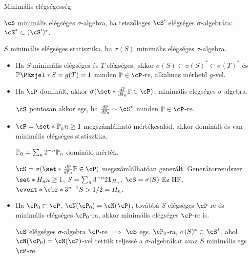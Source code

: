 \documentclass[aspectratio=169,notheorems,9pt,\option]{beamer}
\begin{document}
\begin{frame}{Minimális elégségesség}
  \begin{df}
    $\cS$ minimális elégséges $\sigma$-algebra, ha tetszőleges  
    $\cS'$ elégséges $\sigma$-algebrára: $\cS^*\subset (\cS')^*$.

    $S$ minimális elégséges statisztika, ha $\sigma(S)$ minimális elégséges $\sigma$-algebra.
  \end{df}
  \continue
  \begin{itemize}
    \item Ha $S$ minimális elégséges és $T$ elégséges, akkor $\sigma(S)\subset\sigma(S)^*\subset \sigma(T)^*$ 
    és $\P{S=g(T)}=1$ minden $\P\in\cP$-re, alkalmas mérhető $g$-vel.
    \item Ha $\cP$ dominált, akkor $\sigma(\set*{\frac{d\P}{d\P[0]}}{\P\in\cP})$,
    minimális elégséges $\sigma$-algebra.
    \pause

    $\cS$ pontosan akkor egs, ha $\frac{d\P}{d\P[0]}\sim\cS^*$ minden $\P\in\cP$-re. 

    \item $\cP=\set*{\P[n]}{n\geq1}$ megszámlálható mértékcsalád, akkor 
    dominált és van minimális elégséges statisztika.
    \pause

    $\P[0]=\sum_n 2^{-n}\P[n]$ domináló mérték.

    $\cS=\sigma(\set*{\frac{d\P}{d\P[0]}}{\P\in\cP})$ megszámlálhatóan generált. 
    Generátorrendszer $\set*{H_n}{n\geq1}$, $S=\sum_n 3^{-n} 2\I[H_n]$, $\cS=\sigma(S)$ 
    Ez HF. $\event*{\cbr*{3^{n-1} S}>1/2}=H_n$.

    \item Ha $\cP_0\subset\cP$, $\cN(\cP_0)=\cN(\cP)$, 
    továbbá $S$ elégséges $\cP$-re és minimális elégséges $\cP_0$-ra, akkor 
    minimális elégséges $\cP$-re is.
    \pause

    $\cS$ elégséges $\sigma$-algebra $\cP$-re $\implies$ $\cS$ egs. 
    $\cP_0$-ra, $\sigma(S)^*\subset \cS^*$,
    ahol $\cN(\cP_0)=\cN(\cP)$-vel tettük teljessé a 
    $\sigma$-algebrákat azaz $S$ minimális egs $\cP$-re.
  \end{itemize}
\end{frame}
\end{document}
